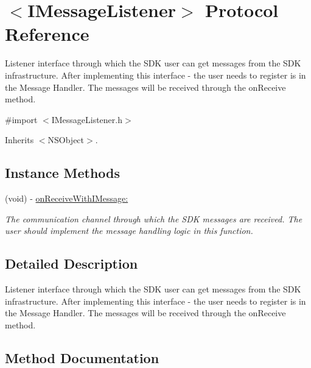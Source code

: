 \hypertarget{protocol_i_message_listener-p}{}\section{$<$I\+Message\+Listener$>$ Protocol Reference}
\label{protocol_i_message_listener-p}


Listener interface through which the S\+D\+K user can get messages from the S\+D\+K infrastructure. After implementing this interface -\/ the user needs to register is in the Message Handler. The messages will be received through the on\+Receive method.  




{\ttfamily \#import $<$I\+Message\+Listener.\+h$>$}



Inherits $<$\+N\+S\+Object$>$.

\subsection*{Instance Methods}
\begin{DoxyCompactItemize}
\item 
(void) -\/ \hyperlink{protocol_i_message_listener-p_ad07f8f7f2ff4180a8dd404d7a8302f9b}{on\+Receive\+With\+I\+Message\+:}
\begin{DoxyCompactList}\small\item\em The communication channel through which the S\+D\+K messages are received. The user should implement the message handling logic in this function. \end{DoxyCompactList}\end{DoxyCompactItemize}


\subsection{Detailed Description}
Listener interface through which the S\+D\+K user can get messages from the S\+D\+K infrastructure. After implementing this interface -\/ the user needs to register is in the Message Handler. The messages will be received through the on\+Receive method. 

\subsection{Method Documentation}
\hypertarget{protocol_i_message_listener-p_ad07f8f7f2ff4180a8dd404d7a8302f9b}{}
